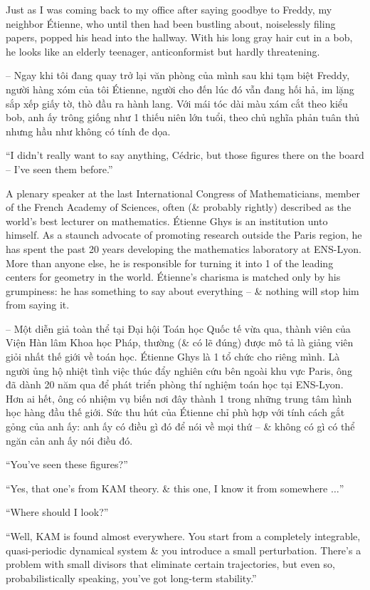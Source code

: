 \documentclass{article}
\begin{document}
\begin{enumerate}
	Just as I was coming back to my office after saying goodbye to {\sc Freddy}, my neighbor {\sc\'Etienne}, who until then had been bustling about, noiselessly filing papers, popped his head into the hallway. With his long gray hair cut in a bob, he looks like an elderly teenager, anticonformist but hardly threatening.

	-- Ngay khi tôi đang quay trở lại văn phòng của mình sau khi tạm biệt {\sc Freddy}, người hàng xóm của tôi {\sc\'Etienne}, người cho đến lúc đó vẫn đang hối hả, im lặng sắp xếp giấy tờ, thò đầu ra hành lang. Với mái tóc dài màu xám cắt theo kiểu bob, anh ấy trông giống như 1 thiếu niên lớn tuổi, theo chủ nghĩa phản tuân thủ nhưng hầu như không có tính đe dọa.

	``I didn't really want to say anything, C\'edric, but those figures there on the board -- I've seen them before.''

	A plenary speaker at the last International Congress of Mathematicians, member of the French Academy of Sciences, often (\& probably rightly) described as the world's best lecturer on mathematics. \'Etienne Ghys is an institution unto himself. As a staunch advocate of promoting research outside the Paris region, he has spent the past 20 years developing the mathematics laboratory at ENS-Lyon. More than anyone else, he is responsible for turning it into 1 of the leading centers for geometry in the world. {\sc\'Etienne}'s charisma is matched only by his grumpiness: he has something to say about everything -- \& nothing will stop him from saying it.

	-- Một diễn giả toàn thể tại Đại hội Toán học Quốc tế vừa qua, thành viên của Viện Hàn lâm Khoa học Pháp, thường (\& có lẽ đúng) được mô tả là giảng viên giỏi nhất thế giới về toán học. \'Etienne Ghys là 1 tổ chức cho riêng mình. Là người ủng hộ nhiệt tình việc thúc đẩy nghiên cứu bên ngoài khu vực Paris, ông đã dành 20 năm qua để phát triển phòng thí nghiệm toán học tại ENS-Lyon. Hơn ai hết, ông có nhiệm vụ biến nơi đây thành 1 trong những trung tâm hình học hàng đầu thế giới. Sức thu hút của {\sc\'Etienne} chỉ phù hợp với tính cách gắt gỏng của anh ấy: anh ấy có điều gì đó để nói về mọi thứ -- \& không có gì có thể ngăn cản anh ấy nói điều đó.

	``You've seen these figures?''

	``Yes, that one's from KAM theory. \& this one, I know it from somewhere $\ldots$''

	``Where should I look?''

	``Well, KAM is found almost everywhere. You start from a completely integrable, quasi-periodic dynamical system \& you introduce a small perturbation. There's a problem with small divisors that eliminate certain trajectories, but even so, probabilistically speaking, you've got long-term stability.''


\end{enumerate}
\end{document}
